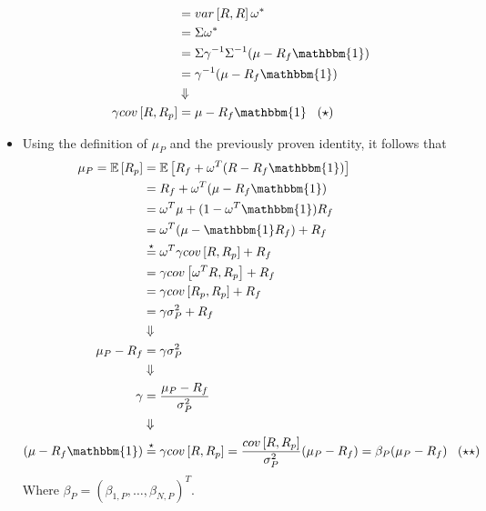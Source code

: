\documentclass[10pt]{article}
\newcommand{\Ebb}{\mathbb{E}}
\newenvironment{exercise}[2][Exercise]{\begin{trivlist}
  \item[\hskip \labelsep {\bfseries #1}\hskip \labelsep {\bfseries #2.}]}{\end{trivlist}}
\begin{document}
\begin{exercise}{1}
\begin{itemize}
\begin{align*}
        &= var \left[ R, R \right] \omega^* \\
        &= \Sigma \omega^* \\
        &= \Sigma \gamma^{-1} \Sigma^{-1} (\mu - R_f \mathbbm{1}) \\
        &=\gamma^{-1}(\mu - R_f \mathbbm{1}) \\
        &\Downarrow \\
          \gamma cov\left[ R, R_p \right]&= \mu - R_f\mathbbm{1} \;\;\; (\star)
      \end{align*}
      \item
        Using the definition of $\mu_P$ and the previously proven identity, it
        follows that
        \begin{align*}
          \mu_P = \Ebb\left[ R_p \right] &= \Ebb\left[ R_f + \omega^T(R - R_f\mathbbm{1}) \right] \\
          &= R_f + \omega^T ( \mu - R_f \mathbbm{1}) \\                                         &= \omega^T \mu + (1 - \omega^T \mathbbm{1}) R_f \\
          &= \omega^T(\mu - \mathbbm{1}R_f) + R_f \\
          &\stackrel{\star}{=} \omega^T\gamma cov\left[ R, R_p \right] + R_f \\
          &= \gamma cov \left[ \omega^TR, R_p \right]+ R_f \\
          &= \gamma cov \left[ R_p, R_p \right] + R_f\\
          &= \gamma \sigma^2_P  + R_f\\
          &\Downarrow \\
          \mu_P - R_f &= \gamma \sigma_P^2\\
          &\Downarrow \\
          \gamma &= \frac{\mu_P - R_f}{\sigma_P^2}\\
          & \Downarrow \\
          (\mu - R_f \mathbbm{1}) &\stackrel{\star}{=} \gamma cov\left[ R, R_p \right] = \frac{cov\left[ R, R_p \right]}{\sigma_P^2} (\mu_P - R_f) = \beta_{P} (\mu_P - R_f) \;\;\; (\star \star)
          \end{align*}
          Where $\beta_{P} = (\beta_{1, P}, \ldots, \beta_{N, P})^T$.


\end{itemize}
\end{exercise}
\end{document}
